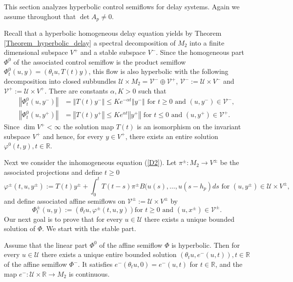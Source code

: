 \documentclass{siamltex}%
\begin{document}
This section analyzes hyperbolic control semiflows for delay systems. Again we
assume throughout that $\det A_{p}\not =0$.

Recall that a hyperbolic homogeneous delay equation yields by Theorem
\ref{Theorem_hyperbolic_delay} a spectral decomposition of $M_{2}$ into a
finite dimensional subspace $V^{+}$ and a stable subspace $V^{-}$. Since the
homogeneous part $\Phi^{0}$ of the associated control semiflow is the product
semiflow $\Phi_{t}^{0}(u,y)=(\theta_{t}u,T(t)y)$, this flow is also hyperbolic
with the following decomposition into closed subbundles $\mathcal{U}\times
M_{2}=\mathcal{V}^{-}\oplus\mathcal{V}^{+}$, $\mathcal{V}^{-}:=\mathcal{U}%
\times V^{-}$ and $\mathcal{V}^{+}:=\mathcal{U}\times V^{+}$. There are
constants $\alpha,K>0$ such that%
\begin{align*}
\left\Vert \Phi_{t}^{0}(u,y^{-})\right\Vert  &  =\left\Vert T(t)y^{-}%
\right\Vert \leq Ke^{-\alpha t}\left\Vert y^{-}\right\Vert \text{ for }%
t\geq0\text{ and }(u,y^{-})\in\mathcal{V}^{-},\\
\left\Vert \Phi_{t}^{0}(u,y^{+})\right\Vert  &  =\left\Vert T(t)y^{+}%
\right\Vert \leq Ke^{\alpha t}\left\Vert y^{+}\right\Vert \text{ for }%
t\leq0\text{ and }(u,y^{+})\in\mathcal{V}^{+}.
\end{align*}
Since $\dim V^{+}<\infty$ the solution map $T(t)$ is an isomorphism on the
invariant subspace $V^{+}$ and hence, for every $y\in V^{+}$, there exists an
entire solution $\varphi^{0}(t,y),t\in\mathbb{R}$.

Next we consider the inhomogeneous equation (\ref{D2}). Let $\pi^{\pm}%
:M_{2}\rightarrow V^{\pm}$ be the associated projections and define $t\geq0$%
\[
\varphi^{\pm}(t,u,y^{\pm}):=T(t)y^{\pm}+\int_{0}^{t}T(t-s)\pi^{\pm
}B(u(s),\ldots,u(s-h_{p})ds\text{ for }(u,y^{\pm})\in\mathcal{U}\times V^{\pm
},
\]
and define associated affine semiflows on $\mathcal{V}^{\pm}:=\mathcal{U}%
\times V^{\pm}$ by%
\[
\Phi_{t}^{\pm}(u,y):=\left(  \theta_{t}u,\varphi^{\pm}(t,u,y)\right)  \text{
for }t\geq0\text{ and }(u,x^{\pm})\in\mathcal{V}^{\pm}.
\]
Our next goal is to prove that for every $u\in\mathcal{U}$ there exists a
unique bounded solution of $\Phi$. We start with the stable part.

\begin{lemma}
\label{Lemma7.2}Assume that the linear part $\Phi^{0}$ of the affine semiflow
$\Phi$ is hyperbolic. Then for every $u\in\mathcal{U}$ there exists a unique
entire bounded solution $(\theta_{t}u,e^{-}(u,t)),\allowbreak t\in\mathbb{R}$
of the affine semiflow $\Phi^{-}$. It satisfies $e^{-}(\theta_{t}%
u,0)=e^{-}(u,t)$ for $t\in\mathbb{R}$, and the map $e^{-}:\mathcal{U}%
\times\mathbb{R}\rightarrow M_{2}$ is continuous.
\end{lemma}
\end{document}
